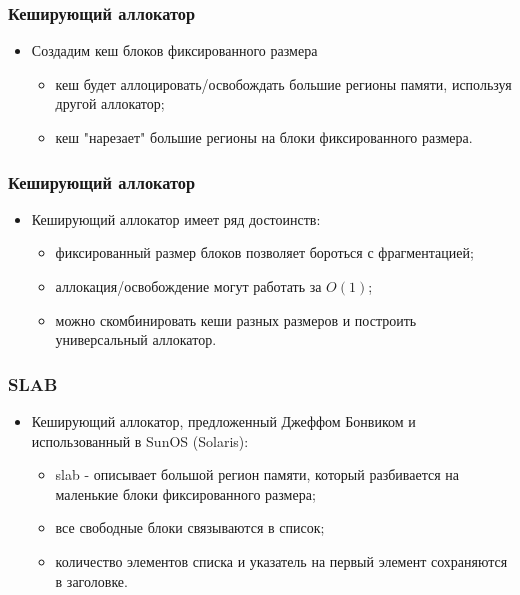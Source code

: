 \begin{frame}
\frametitle{Кеширующий аллокатор}
\begin{itemize}
    \item<1->Создадим кеш блоков фиксированного размера
    \begin{itemize}
        \item<2->кеш будет аллоцировать/освобождать большие регионы памяти,
        используя другой аллокатор;
        \item<3->кеш "нарезает" большие регионы на блоки фиксированного размера.
    \end{itemize}
\end{itemize}
\end{frame}

\begin{frame}
\frametitle{Кеширующий аллокатор}
\begin{itemize}
    \item<1->Кеширующий аллокатор имеет ряд достоинств:
    \begin{itemize}
        \item<2->фиксированный размер блоков позволяет бороться с фрагментацией;
        \item<3->аллокация/освобождение могут работать за $O\left(1\right)$;
        \item<4->можно скомбинировать кеши разных размеров и построить
        универсальный аллокатор.
    \end{itemize}
\end{itemize}
\end{frame}

\begin{frame}
\frametitle{SLAB}
\begin{itemize}
    \item<1->Кеширующий аллокатор, предложенный Джеффом Бонвиком и
    использованный в SunOS (Solaris):
    \begin{itemize}
        \item<2->slab - описывает большой регион памяти, который разбивается на
        маленькие блоки фиксированного размера;
        \item<3->все свободные блоки связываются в список;
        \item<3->количество элементов списка и указатель на первый элемент
        сохраняются в заголовке.
    \end{itemize}
\end{itemize}
\end{frame}

